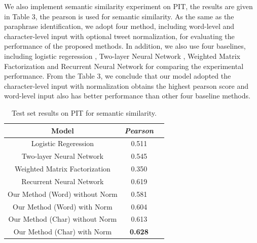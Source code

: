 \documentclass[letterpaper]{article}
\begin{document}
We also implement semantic similarity experiment on PIT, the results are given in Table 3, the pearson is used for semantic similarity. As the same as the paraphrase identification, we adopt four method, including word-level and character-level input with optional tweet normalization, for evaluating the performance of the proposed methods. In addition, we also use four baselines, including logistic regeression \cite{das-smith:2009:ACLIJCNLP}, Two-layer Neural Network \cite{bertero-fung:2015:SemEval}, Weighted Matrix Factorization \cite{guo-diab:2012:ACL2012} and Recurrent Neural Network \cite{zarrella-EtAl:2015:SemEval} for comparing the experimental performance. From the Table 3, we conclude that our model adopted the character-level input with normalization obtains the highest pearson score and word-level input also has better performance than other four baseline methods.

\begin{table}
	\begin{center}
		\begin{tabular}{| c | c | c | }
			\hline
			\bf Model & \bf \textit{Pearson}  \\ \hline
			Logistic Regeression  & 0.511   \\ \hline
			Two-layer Neural Network  & 0.545   \\ 
			\hline
			Weighted Matrix Factorization  & 0.350   \\ 
			\hline
			Recurrent Neural Network  & 0.619   \\ 
			\hline
			Our Method (Word) without Norm  & 0.581   \\ 
			\hline
			Our Method (Word) with Norm  & 0.604   \\ 
			\hline
			Our Method (Char) without Norm & 0.613   \\ 
			\hline
			Our Method (Char) with Norm  & \bf 0.628  \\ 
			\hline
		\end{tabular}
		\caption{Test set results on PIT for semantic similarity.}
	\end{center}
\end{table}
\end{document}
